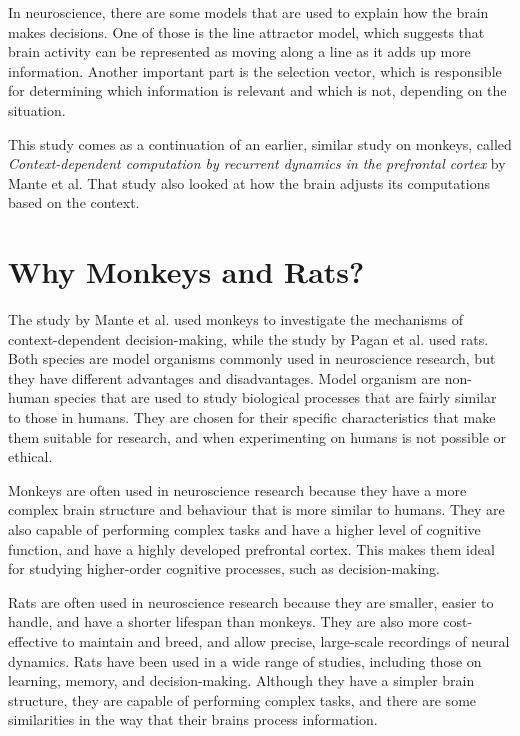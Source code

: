 \documentclass{article}
\begin{document}
In neuroscience, there are some models that are used to explain how the brain makes decisions. One of those is the line attractor model, which suggests that brain activity can be represented as moving along a line as it adds up more information. Another important part is the selection vector, which is responsible for determining which information is relevant and which is not, depending on the situation.

This study comes as a continuation of an earlier, similar study on monkeys, called \textit{Context-dependent computation by recurrent dynamics in the prefrontal cortex} by Mante et al. That study also looked at how the brain adjusts its computations based on the context.


\section{Why Monkeys and Rats?}
The study by Mante et al. used monkeys to investigate the mechanisms of context-dependent decision-making, while the study by Pagan et al. used rats. Both species are model organisms commonly used in neuroscience research, but they have different advantages and disadvantages. Model organism are non-human species that are used to study biological processes that are fairly similar to those in humans. They are chosen for their specific characteristics that make them suitable for research, and when experimenting on humans is not possible or ethical.

Monkeys are often used in neuroscience research because they have a more complex brain structure and behaviour that is more similar to humans. They are also capable of performing complex tasks and have a higher level of cognitive function, and have a highly developed prefrontal cortex. This makes them ideal for studying higher-order cognitive processes, such as decision-making.

Rats are often used in neuroscience research because they are smaller, easier to handle, and have a shorter lifespan than monkeys. They are also more cost-effective to maintain and breed, and allow precise, large-scale recordings of neural dynamics. Rats have been used in a wide range of studies, including those on learning, memory, and decision-making. Although they have a simpler brain structure, they are capable of performing complex tasks, and there are some similarities in the way that their brains process information.
\end{document}
